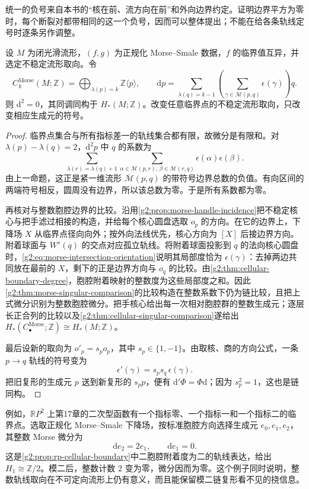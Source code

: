 统一的负号来自本书的“核在前、流方向在前”和外向边界约定。证明边界平方为零时，每个断裂对都带相同的这一个负号，因而可以整体提出；不能在给各条轨线定号时逐条另作调整。

\begin{theorem}\label{g2:thm:integer-morse-complex}
	设 \(M\) 为闭光滑流形，\((f,g)\) 为正规化 Morse--Smale 数据，\(f\) 的临界值互异，并选定不稳定流形取向。令
	\[
		C_k^{\mathrm{Morse}}(M;\mathbb Z)
		=\bigoplus_{\lambda(p)=k}\mathbb Z\langle p\rangle,\qquad
		\mathrm d p=\sum_{\lambda(q)=k-1}
		\left(\sum_{\gamma\in\mathcal M(p,q)}\epsilon(\gamma)\right)q.
	\]
	则 \(\mathrm d^2=0\)，其同调同构于 \(H_*(M;\mathbb Z)\)。改变任意临界点的不稳定流形取向，只改变相应生成元的符号。
\end{theorem}
\begin{proof}
	临界点集合与所有指标差一的轨线集合都有限，故微分是有限和。对 \(\lambda(p)-\lambda(q)=2\)，\(\mathrm d^2p\) 中 \(q\) 的系数为
	\[
		\sum_{\lambda(r)=\lambda(q)+1}
		\sum_{\alpha\in\mathcal M(p,r),\,\beta\in\mathcal M(r,q)}
		\epsilon(\alpha)\epsilon(\beta).
	\]
	由上一命题，这正是紧一维流形 \(\overline{\mathcal M}(p,q)\) 的带符号边界总数的负值。有向区间的两端符号相反，圆周没有边界，所以该总数为零。于是所有系数都为零。

	再核对与整数胞腔边界的比较。沿用\cref{g2:prop:morse-handle-incidence}把不稳定核心与把手滤过相接的构造，并给每个核心圆盘选取 \(o_p\) 的方向。在它的边界上，下降场 \(X\) 从临界点径向向外；按外向法线优先，核心方向为 \([X]\) 后接边界方向。附着球面与 \(W^s(q)\) 的交点对应孤立轨线。将附着球面投影到 \(q\) 的法向核心圆盘时，\eqref{g2:eq:morse-intersection-orientation}说明其局部度恰为 \(\epsilon(\gamma)\)：去掉两边共同放在最前的 \(X\)，剩下的正是边界方向与 \(o_q\) 的比较。由\cref{g2:thm:cellular-boundary-degree}，胞腔附着映射的整数度为这些局部度之和。因此\cref{g2:thm:morse-singular-comparison}的比较构造在整数系数下仍为链比较，且把上式微分识别为整数胞腔微分。把手核心给出每一次相对胞腔群的整数生成元；逐层长正合列的比较以及\cref{g2:thm:cellular-singular-comparison}遂给出 \(H_*(C^{\mathrm{Morse}}_\bullet;\mathbb Z)\cong H_*(M;\mathbb Z)\)。

	最后设新的取向为 \(o'_p=s_po_p\)，其中 \(s_p\in\{1,-1\}\)。由取核、商的方向公式，一条 \(p\to q\) 轨线的符号变为
	\[
		\epsilon'(\gamma)=s_ps_q\,\epsilon(\gamma).
	\]
	把旧复形的生成元 \(p\) 送到新复形的 \(s_pp\)，便有 \(\mathrm d'\Phi=\Phi\mathrm d\)；因为 \(s_p^2=1\)，这也是链同构。
\end{proof}

例如，\(\mathbb RP^2\) 上第17章的二次型函数有一个指标零、一个指标一和一个指标二的临界点。选取正规化 Morse--Smale 下降场，按标准胞腔方向选择生成元 \(e_0,e_1,e_2\)，其整数 Morse 微分为
\[
	\mathrm d e_2=2e_1,\qquad \mathrm d e_1=0.
\]
这是\cref{g2:prop:rp-cellular-boundary}中二胞腔附着度为二的轨线表达，给出 \(H_1\cong\mathbb Z/2\)。模二后，整数计数 \(2\) 变为零，微分因而为零。这个例子同时说明，整数轨线取向在不可定向流形上仍有意义，而且能保留模二链复形看不见的挠信息。

